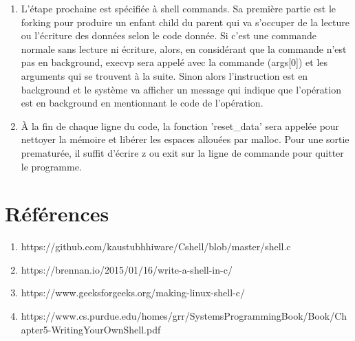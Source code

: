 \documentclass{article}
\begin{document}
\begin{enumerate}
\item{L'étape prochaine est spécifiée à shell commands. Sa première partie est le forking pour produire un enfant child du parent qui va s'occuper de la lecture ou l'écriture des données selon le code donnée. Si c'est une commande normale sans lecture ni écriture, alors, en considérant que la commande n'est pas en background, execvp sera appelé avec la commande (args[0]) et les arguments qui se trouvent à la suite. Sinon alors l'instruction est en background et le système va afficher un message qui indique que l'opération est en background en mentionnant le code de l'opération.}

\item{À la fin de chaque ligne du code, la fonction 'reset\_data' sera appelée pour nettoyer la mémoire et libérer les espaces allouées par malloc. Pour une sortie prematurée, il suffit d'écrire z ou exit sur la ligne de commande pour quitter le programme.}
\end{enumerate}

\section{Références}
\begin{enumerate}
\item{https://github.com/kaustubhhiware/Cshell/blob/master/shell.c}
\item{https://brennan.io/2015/01/16/write-a-shell-in-c/}
\item{https://www.geeksforgeeks.org/making-linux-shell-c/}
\item{https://www.cs.purdue.edu/homes/grr/SystemsProgrammingBook/Book/Chapter5-WritingYourOwnShell.pdf}
\end{enumerate}
\end{document}
